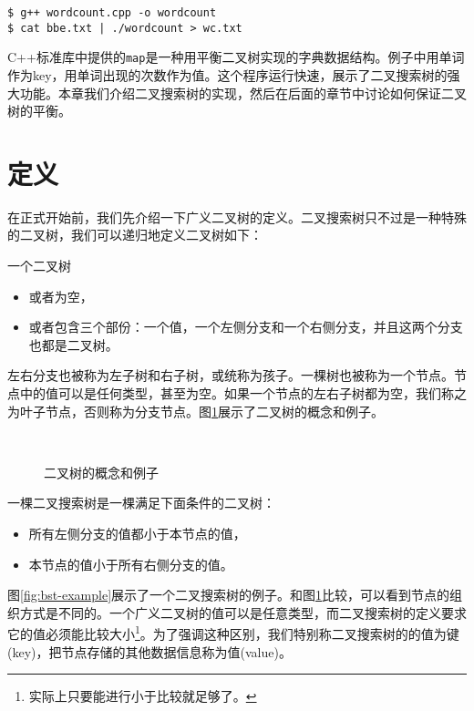 \documentclass{ctexart}
\begin{document}
\begin{verbatim}
$ g++ wordcount.cpp -o wordcount
$ cat bbe.txt | ./wordcount > wc.txt
\end{verbatim}

C++标准库中提供的\texttt{map}是一种用平衡二叉树实现的字典数据结构。例子中用单词作为key，用单词出现的次数作为值。这个程序运行快速，展示了二叉搜索树的强大功能。本章我们介绍二叉搜索树的实现，然后在后面的章节中讨论如何保证二叉树的平衡。

\section{定义}
\label{introduction} 

在正式开始前，我们先介绍一下广义二叉树的定义。二叉搜索树只不过是一种特殊的二叉树，我们可以递归地定义二叉树如下：

一个二叉树
\begin{itemize}
\item 或者为空，
\item 或者包含三个部份：一个值，一个左侧分支和一个右侧分支，并且这两个分支也都是二叉树。
\end{itemize}

左右分支也被称为左子树和右子树，或统称为孩子。一棵树也被称为一个节点。节点中的值可以是任何类型，甚至为空。如果一个节点的左右子树都为空，我们称之为叶子节点，否则称为分支节点。图\ref{fig:binary-tree-example}展示了二叉树的概念和例子。

\begin{figure}[htbp]
  \centering
   \\
  \caption{二叉树的概念和例子}
  \label{fig:binary-tree-example}
\end{figure}

一棵二叉搜索树是一棵满足下面条件的二叉树：
\begin{itemize}
\item 所有左侧分支的值都小于本节点的值，
\item 本节点的值小于所有右侧分支的值。
\end{itemize}

图\ref{fig:bst-example}展示了一个二叉搜索树的例子。和图\ref{fig:binary-tree-example}比较，可以看到节点的组织方式是不同的。一个广义二叉树的值可以是任意类型，而二叉搜索树的定义要求它的值必须能比较大小\footnote{实际上只要能进行小于比较就足够了。}。为了强调这种区别，我们特别称二叉搜索树的的值为键(key)，把节点存储的其他数据信息称为值(value)。
\end{document}
